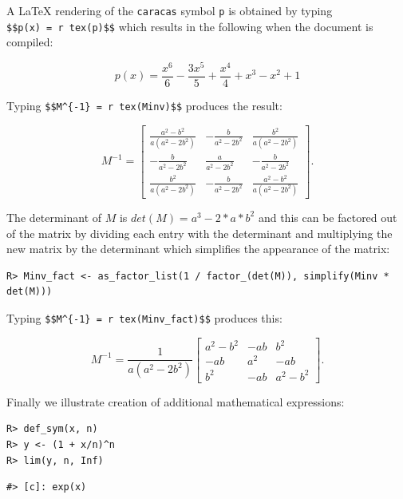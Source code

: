 A LaTeX rendering of the \texttt{caracas} symbol \texttt{p} is obtained by typing
\texttt{\$\$p(x)\ =\ \textasciigrave{}r\ tex(p)\textasciigrave{}\$\$} which results in the following when the document is compiled:

\[
p(x) = \frac{x^{6}}{6} - \frac{3 x^{5}}{5} + \frac{x^{4}}{4} + x^{3} - x^{2} + 1
\]

Typing \texttt{\$\$M\^{}\{-1\}\ =\ \textasciigrave{}r\ tex(Minv)\textasciigrave{}\$\$}
produces the result:

\[
M^{-1} = \left[\begin{matrix}\frac{a^{2} - b^{2}}{a \left(a^{2} - 2 b^{2}\right)} & - \frac{b}{a^{2} - 2 b^{2}} & \frac{b^{2}}{a \left(a^{2} - 2 b^{2}\right)}\\- \frac{b}{a^{2} - 2 b^{2}} & \frac{a}{a^{2} - 2 b^{2}} & - \frac{b}{a^{2} - 2 b^{2}}\\\frac{b^{2}}{a \left(a^{2} - 2 b^{2}\right)} & - \frac{b}{a^{2} - 2 b^{2}} & \frac{a^{2} - b^{2}}{a \left(a^{2} - 2 b^{2}\right)}\end{matrix}\right] .
\]

The determinant of \(M\) is \(det(M)=a^3 - 2*a*b^2\) and this can be factored out of the matrix by dividing each entry with the determinant and multiplying the new matrix by the determinant which simplifies the appearance of the matrix:

\begin{verbatim}
R> Minv_fact <- as_factor_list(1 / factor_(det(M)), simplify(Minv * det(M)))
\end{verbatim}

Typing \texttt{\$\$M\^{}\{-1\}\ =\ \textasciigrave{}r\ tex(Minv\_fact)\textasciigrave{}\$\$} produces this:

\[
M^{-1} = \frac{1}{a \left(a^{2} - 2 b^{2}\right)}  \left[\begin{matrix}a^{2} - b^{2} & - a b & b^{2}\\- a b & a^{2} & - a b\\b^{2} & - a b & a^{2} - b^{2}\end{matrix}\right].
\]

Finally we illustrate creation of additional mathematical expressions:

\begin{verbatim}
R> def_sym(x, n)
R> y <- (1 + x/n)^n
R> lim(y, n, Inf)
\end{verbatim}

\begin{verbatim}
#> [c]: exp(x)
\end{verbatim}

